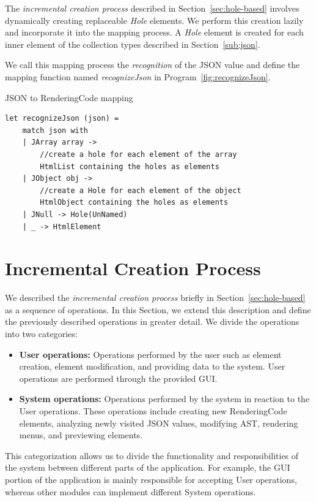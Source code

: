 The \emph{incremental creation process} described in Section~\ref{sec:hole-based} involves dynamically creating replaceable \emph{Hole} elements.
We perform this creation lazily and incorporate it into the mapping process.
A \emph{Hole} element is created for each inner element of the collection types described in Section~\ref{sub:json}.

We call this mapping process the \emph{recognition} of the JSON value and define the mapping function named \emph{recognizeJson} in Program~\ref{fig:recognizeJson}.

\begin{listing}[H]
	\caption {JSON to RenderingCode mapping}
	\label{fig:recognizeJson}
	\begin{lstlisting}
let recognizeJson (json) =
    match json with
    | JArray array -> 
        //create a hole for each element of the array
        HtmlList containing the holes as elements
    | JObject obj ->
        //create a Hole for each element of the object 
        HtmlObject containing the holes as elements
    | JNull -> Hole(UnNamed)
    | _ -> HtmlElement 
  \end{lstlisting}
\end{listing}

\section{Incremental Creation Process}
\label{sec:creation}
We described the \emph{incremental creation process} briefly in Section~\ref{sec:hole-based} as a sequence of operations.
In this Section, we extend this description and define the previously described operations in greater detail.
We divide the operations into two categories:
\begin{itemize}
	\item \textbf{User operations:} Operations performed by the user such as element creation, element modification, and providing data to the system.
	      User operations are performed through the provided GUI.
	\item \textbf{System operations:} Operations performed by the system in reaction to the User operations.
	      These operations include creating new RenderingCode elements, analyzing newly visited JSON values, modifying AST, rendering menus, and previewing elements.
\end{itemize}
This categorization allows us to divide the functionality and responsibilities of the system between different parts of the application.
For example, the GUI portion of the application is mainly responsible for accepting User operations, whereas other modules can implement different System operations.

